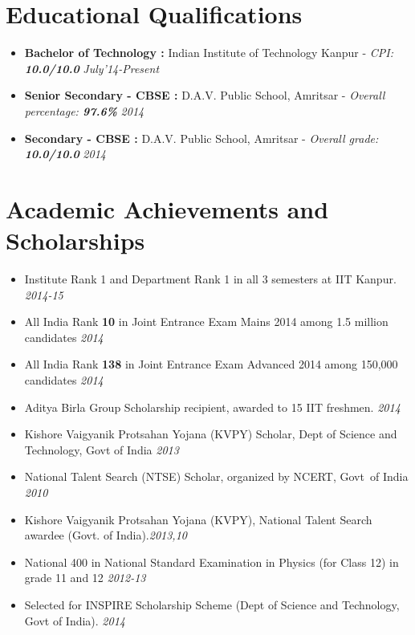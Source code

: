 \documentclass[11pt,a4paper]{moderncv}
\newcommand{\education}[5]{
\item[] \textbf{\large{#1 :}} #2 - \emph{#3: \textbf{#4}} \hfill\textit{#5}
}
\newcommand{\onepage}[1]{
\ifdefined\onep
#1
\fi
}
\newcommand{\twopage}[1]{
\ifdefined\twop
#1
\fi
}
\newcommand{\secspace}{
\onepage{\vspace{-0.27cm}}
\twopage{\vspace{-0.1cm}}
}
\newcommand{\secbelow}{
\onepage{\vspace{-0.07cm}}
}
\begin{document}
\maketitle
\onepage{\vspace{-1.4cm}}
\twopage{\vspace{-1cm}}
\section*{Educational Qualifications}
\secbelow
\begin{itemize}
  \twopage{\setlength\itemsep{0.2cm}}
  \education{Bachelor of Technology}{Indian Institute of Technology Kanpur}{CPI}{10.0/10.0}{July'14-Present}
  \education{Senior Secondary - CBSE}{D.A.V. Public School, Amritsar}{Overall percentage}{97.6\%}{2014}
  \education{Secondary - CBSE}{D.A.V. Public School, Amritsar}{Overall grade}{10.0/10.0}{2014}
\end{itemize}

\secspace
\section*{Academic Achievements and Scholarships}
\secbelow
\begin{itemize}
  \twopage{\setlength\itemsep{0.5em}}
  \item Institute Rank 1 and Department Rank 1 in all 3
    semesters at IIT Kanpur. \hfill \textit{2014-15}
  \item All India Rank \textbf{10} in Joint Entrance Exam Mains 2014 among 1.5 million candidates              \hfill \textit{2014}
  \item All India Rank \textbf{138} in Joint Entrance Exam Advanced 2014 among 150,000 candidates            	\hfill \textit{2014}
  \item Aditya Birla Group Scholarship recipient, awarded to 15 IIT freshmen. \hfill \textit{2014}

  \twopage{
  \item Kishore Vaigyanik Protsahan Yojana (KVPY) Scholar, Dept of Science and Technology, Govt of India
    \hfill \textit{2013}
  \item National Talent Search (NTSE) Scholar, organized by NCERT, Govt\ of India
    \hfill \textit{2010}}

  \onepage{\item Kishore Vaigyanik Protsahan Yojana (KVPY), National
    Talent Search awardee (Govt. of India).\hfill\textit{2013,10}}

  \twopage{
    \item National 400 in National Standard Examination in Physics (for Class 12) in grade 11 and 12 \hfill \textit{2012-13}
    \item Selected for INSPIRE Scholarship Scheme (Dept of Science and Technology, Govt of India). \hfill \textit{2014}}

\end{itemize}
\end{document}
